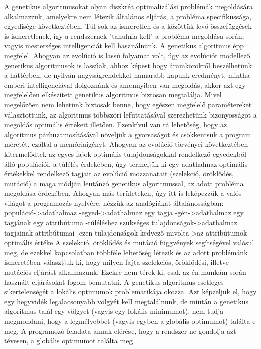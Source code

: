 \documentclass[a4paper,12pt]{article}
\begin{document}
A genetikus algoritmusokat olyan diszkrét optimalizálási problémák megoldására alkalmazzuk,
amelyekre nem létezik általános eljárás, a probléma specifikussága, egyedisége következtében.
Túl sok az ismeretlen és a közöttük levő összefüggések is ismeretlenek, így a rendszernek 
"tanulnia kell" a probléma megoldása során, vagyis mesterséges intelligenciát kell 
használnunk. A genetikus algoritmus épp megfelel. Ahogyan az evolúció is lassú folyamat volt,
úgy az evolúciót modellező genetikus algoritmusok is lassúak, ahhoz képest hogy áramkörökről
beszélhetünk a háttérben, de nyilván nagyságrendekkel hamarabb kapunk eredményt, mintha emberi
intelligenciával dolgoznánk és amennyiben van megoldás, akkor azt egy megfelelően elkészített
genetikus algoritmus biztosan megtalálja. Mivel megelőzően nem lehetünk biztosak benne, hogy
egészen megfelelő paramétereket választottunk, az algoritmus többszöri lefuttatásával 
szerezhetünk bizonyosságot a megoldás optimális értékeit illetően. Ezenkívül van rá lehetőség,
hogy az algoritmus párhuzamosításával növeljük a gyorsaságot és csökkentsük a program méretét,
ezáltal a memóriaigényt.
Ahogyan az evolúció törvényei következtében kitermelődtek az egyes fajok optimális 
tulajdonságokkal rendelkező egyedekből álló populációi, a túlélés érdekében, úgy termeljük ki
egy adathalmaz optimális értékekkel rendelkező tagjait az evolúció mozzanatait (szelekció,
öröklődés, mutáció) a maga módján leutánzó genetikus algoritmussal, az adott probléma 
megoldása érdekében. Ahogyan más területeken, úgy itt is leképezzük a valós világot a
programozás nyelvére, nézzük az analógiákat általánosságban:
-populáció->adathalmaz
-egyed->adathalmaz egy tagja
-gén->adathalmaz egy tagjának egy attribútuma
-túléléshez szükséges tulajdonságok->adathalmaz tagjainak attribútumai
-ezen tulajdonságok kedvező mivolta->az attribútumok optimális értéke
A szelekció, öröklődés és mutáció függvények segítségével valósul meg, de ezekkel
kapcsolatban többféle lehetőség létezik és az adott problémánk ismeretében választjuk ki,
hogy milyen fajta szelekciós, öröklődési, illetve mutációs eljárást alkalmazunk. Ezekre nem
térek ki, csak az én munkám során használt eljárásokat fogom bemutatni.
A genetikus algoritmus esetleges sikertelenségét a lokális optimumok problematikája okozza. 
Azt képzeljük el, hogy egy hegyvidék legalacsonyabb völgyét kell megtalálnunk, de miután a
genetikus algoritmus talál egy völgyet (vagyis egy lokális minimumot), nem tudja megmondani,
hogy a legmélyebbet (vagyis egyben a globális optimumot) találta-e meg. A programozó feladata
annak elérése, hogy a rendszer ne gondolja azt tévesen, a globális optimumot találta meg. 
\end{document}
